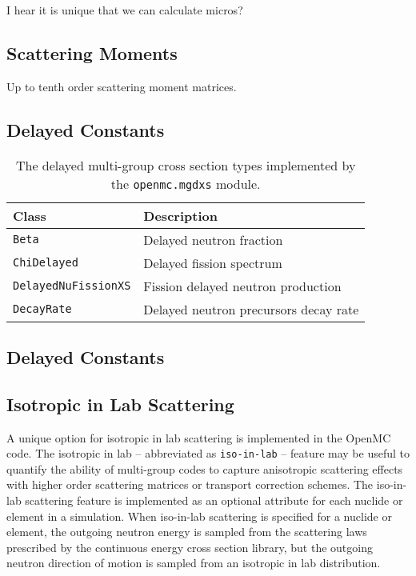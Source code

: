 I hear it is unique that we can calculate micros?


\subsection{Scattering Moments}
\label{subsec:scatt-moments}

Up to tenth order scattering moment matrices.


\subsection{Delayed Constants}
\label{subsec:delay-constants}

\begin{table}[h!]
  \centering
  \caption{The delayed multi-group cross section types implemented by the \texttt{openmc.mgdxs} module.}
  \small
  \label{tab:mdgxs-types} 
  \vspace{6pt}
  \begin{tabular}{l l}
  \toprule
  \textbf{Class} &
  \textbf{Description} \\
  \midrule
  \texttt{Beta} & Delayed neutron fraction \\
  \texttt{ChiDelayed} & Delayed fission spectrum \\
  \texttt{DelayedNuFissionXS} & Fission delayed neutron production \\
  \texttt{DecayRate} & Delayed neutron precursors decay rate \\
  \bottomrule
\end{tabular}
\end{table}

\subsection{Delayed Constants}
\label{subsec:delay-constants}


\subsection{Isotropic in Lab Scattering}
\label{subsec:iso-in-lab}

A unique option for isotropic in lab scattering is implemented in the OpenMC code. The isotropic in lab -- abbreviated as \texttt{iso-in-lab} -- feature may be useful to quantify the ability of multi-group codes to capture anisotropic scattering effects with higher order scattering matrices or transport correction schemes. The iso-in-lab scattering feature is implemented as an optional attribute for each nuclide or element in a simulation. When iso-in-lab scattering is specified for a nuclide or element, the outgoing neutron energy is sampled from the scattering laws prescribed by the continuous energy cross section library, but the outgoing neutron direction of motion is sampled from an isotropic in lab distribution. 